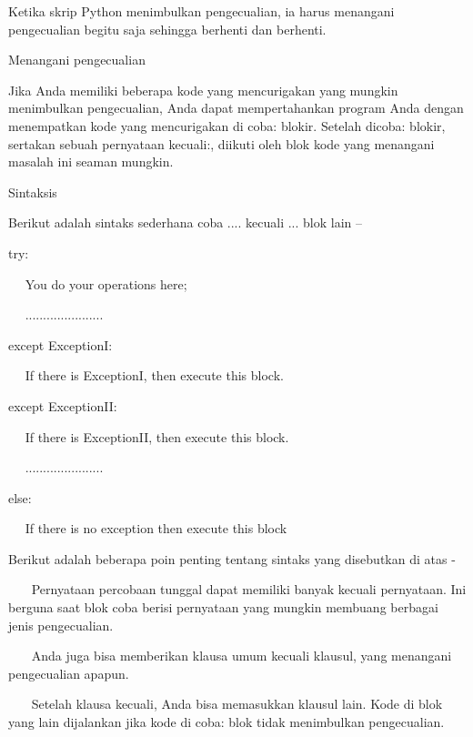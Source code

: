 \vspace{12pt}
Ketika skrip Python menimbulkan pengecualian, ia harus menangani pengecualian begitu saja sehingga berhenti dan berhenti. \par
Menangani pengecualian \par
\vspace{12pt}
Jika Anda memiliki beberapa kode yang mencurigakan yang mungkin menimbulkan pengecualian, Anda dapat mempertahankan program Anda dengan menempatkan kode yang mencurigakan di coba: blokir. Setelah dicoba: blokir, sertakan sebuah pernyataan kecuali:, diikuti oleh blok kode yang menangani masalah ini seaman mungkin. \par
Sintaksis \par
\vspace{12pt}
Berikut adalah sintaks sederhana coba .... kecuali ... blok lain – \par
\vspace{12pt}
try: \par
~~ You do your operations here; \par
~~ ...................... \par
except ExceptionI: \par
~~ If there is ExceptionI, then execute this block. \par
except ExceptionII: \par
~~ If there is ExceptionII, then execute this block. \par
~~ ...................... \par
else: \par
~~ If there is no exception then execute this block \par
\vspace{12pt}
\vspace{12pt}
Berikut adalah beberapa poin penting tentang sintaks yang disebutkan di atas - \par
\vspace{12pt}
~~~ Pernyataan percobaan tunggal dapat memiliki banyak kecuali pernyataan. Ini berguna saat blok coba berisi pernyataan yang mungkin membuang berbagai jenis pengecualian. \par
\vspace{12pt}
~~~ Anda juga bisa memberikan klausa umum kecuali klausul, yang menangani pengecualian apapun. \par
\vspace{12pt}
~~~ Setelah klausa kecuali, Anda bisa memasukkan klausul lain. Kode di blok yang lain dijalankan jika kode di coba: blok tidak menimbulkan pengecualian. \par
